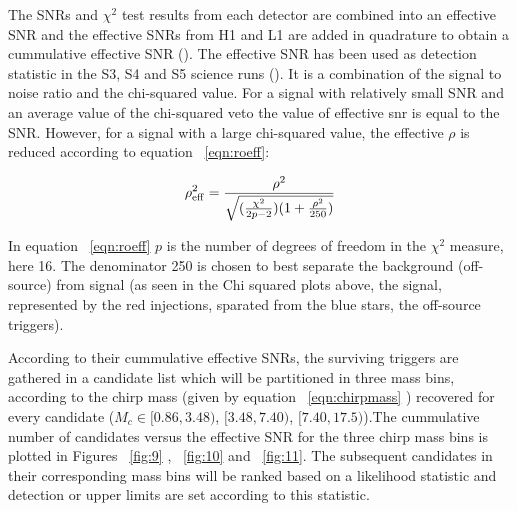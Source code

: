 \documentclass[epsf]{article}
\begin{document}
The SNRs and  $\chi^2$ test results from each detector are combined into an effective SNR and the effective SNRs from H1 and L1 are added in quadrature to obtain a cummulative effective SNR (\cite{abbott2006,abbott2007,grb}). The effective SNR has been used as detection statistic in the S3, S4 and S5 science runs (\cite{abbott2007,grb}). It is a combination of the signal to noise ratio and the chi-squared value. For a signal with relatively small SNR and an average value of the chi-squared veto the value of effective snr is equal to the SNR. However, for a signal with a large chi-squared value, the effective $\rho$ is reduced according to equation ~\ref{eqn:roeff}:

\begin{equation}
\rho^2_{{\rm eff}} = \frac{\rho^2}{\sqrt {( \frac {\chi^2}{2p-2})(1+ \frac {\rho^2}{250})}}
\label{eqn:roeff}
\end{equation}

In equation ~\ref{eqn:roeff} $p$ is the number of degrees of freedom in the $\chi^2$ measure, here 16. The denominator 250 is chosen to best separate the background (off-source) from signal (as seen in the Chi squared plots above, the signal, represented by the red injections, sparated from the blue stars, the off-source triggers).

 According to their cummulative effective SNRs, the surviving triggers are gathered in a candidate list which will be partitioned in three mass bins, according to the chirp mass (given by equation ~\ref{eqn:chirpmass} ) recovered for every candidate ($M_c \in [0.86,3.48)$, $[3.48,7.40)$, $[7.40,17.5)$).The cummulative number of candidates versus the effective SNR for the three chirp mass bins is plotted in Figures ~\ref{fig:9} , ~\ref{fig:10} and ~\ref{fig:11}. The subsequent candidates in their corresponding mass bins will be ranked based on a likelihood statistic and detection or upper limits are set according to this statistic.
\end{document}
